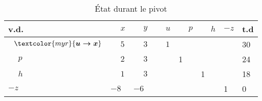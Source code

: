 \documentclass{report}
\begin{document}
\begin{multicols*}{2}
\begin{itemize}
        \begin{table}[H]
                \begin{center}
                    \renewcommand{\arraystretch}{1.5}
                    \selectfont
                    \footnotesize
                        \begin{tabular}{|l|l l l l l |l|l|}
                        \arrayrulecolor{myb}
                        \hline
                        v.d. & $\phantom{-}x$
                             & $\phantom{-}y$ & $\phantom{-}u$ & $\phantom{-}p$ & $\phantom{-}h$ & $-z$ & t.d 
                        \\
                        \hline
                        \arrayrulecolor{black}
                        $\phantom{-}\textcolor{myr}{\boldsymbol{u \rightarrow x}} 
                        $     & $\phantom{-}5$ 
                                & $\phantom{-}3$
                                & $\phantom{-}1$
                                & 
                                & &  &  30
                        \\
                        $\phantom{-}p$     
                               & $\phantom{-}2$
                               & $\phantom{-}3$
                               & & 1
                               & & & 24 
                        \\
                        $\phantom{-}h$     
                               & $\phantom{-}1$
                               & $\phantom{-}3$ 
                               &  & 
                               &  1
                               & & 18 
                        \\ 
                        \hline
                        $-z$ 
                               & $-8$
                                & $-6$
                                & 
                                & 
                                & 
                                & 1 & 0 
                        \\
                        \hline 



                        \end{tabular}
                \end{center}
        \caption{État durant le pivot}
        \end{table}


\end{itemize}
\end{multicols*}
\end{document}
